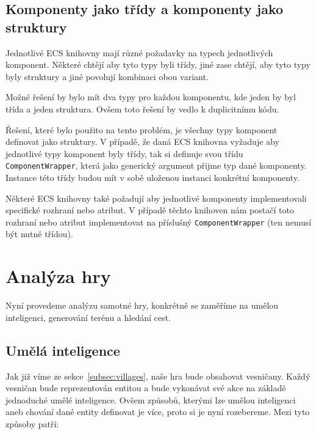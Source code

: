 \subsection{Komponenty jako třídy a komponenty jako struktury}
Jednotlivé ECS knihovny mají různé požadavky na typech jednotlivých komponent. Některé chtějí aby tyto typy byli třídy, jiné zase chtějí, aby tyto typy byly struktury a jiné povolují kombinaci obou variant.

Možné řešení by bylo mít dva typy pro každou komponentu, kde jeden by byl třída a jeden struktura. Ovšem toto řešení by vedlo k duplicitnímu kódu.

Řešení, které bylo použito na tento problém, je všechny typy komponent definovat jako struktury. V případě, že daná ECS knihovna vyžaduje aby jednotlivé typy komponent byly třídy, tak si definuje svou třídu \texttt{ComponentWrapper}, která jako generický argument přijme typ dané komponenty. Instance této třídy budou mít v sobě uloženou instanci konkrétní komponenty.

Některé ECS knihovny také požadují aby jednotlivé komponenty implementovali specifické rozhraní nebo atribut. V případě těchto knihoven nám postačí toto rozhraní nebo atribut implementovat na příslušný \texttt{ComponentWrapper} (ten nemusí být nutně třídou).

\section{Analýza hry}
Nyní provedeme analýzu samotné hry, konkrétně se zaměříme na umělou inteligenci, generování terénu a hledání cest.

\subsection{Umělá inteligence}
Jak již víme ze sekce~\ref{subsec:villages}, naše hra bude obsahovat vesničany. Každý vesničan bude reprezentován entitou a bude vykonávat své akce na základě jednoduché umělé inteligence. Ovšem způsobů, kterými lze umělou inteligenci aneb chování dané entity definovat je více, proto si je nyní rozebereme. Mezi tyto způsoby patří:

